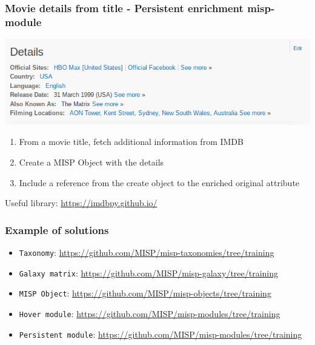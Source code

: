 \begin{frame}
    \frametitle{Movie details from title - Persistent enrichment misp-module}
    \begin{center}
        \includegraphics[width=0.85\linewidth]{pics/movie-details2}
    \end{center}
    \begin{enumerate}
        \item From a movie title, fetch additional information from IMDB
        \item Create a MISP Object with the details
        \item Include a reference from the create object to the enriched original attribute
    \end{enumerate}
    \vspace{1em}
    Useful library: \url{https://imdbpy.github.io/}
\end{frame}

\begin{frame}
    \frametitle{Example of solutions}
    \begin{itemize}
        \item \texttt{Taxonomy}: {\tiny \url{https://github.com/MISP/misp-taxonomies/tree/training}}
        \item \texttt{Galaxy matrix}: {\tiny \url{https://github.com/MISP/misp-galaxy/tree/training}}
        \item \texttt{MISP Object}: {\tiny \url{https://github.com/MISP/misp-objects/tree/training}}
        \item \texttt{Hover module}: {\tiny \url{https://github.com/MISP/misp-modules/tree/training}}
        \item \texttt{Persistent module}: {\tiny \url{https://github.com/MISP/misp-modules/tree/training}}
    \end{itemize}
\end{frame}
